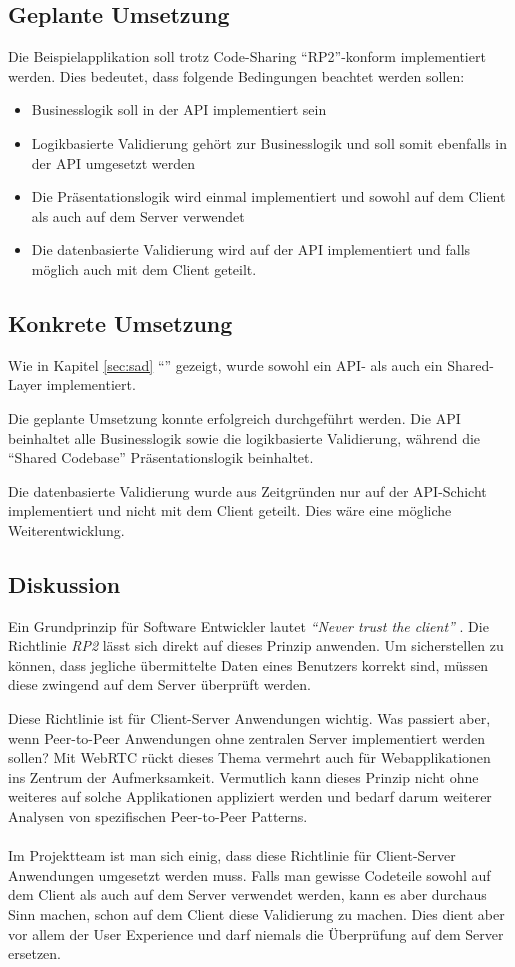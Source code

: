 \subsection*{Geplante Umsetzung}
Die Beispielapplikation soll trotz Code-Sharing ``RP2''-konform implementiert werden. Dies bedeutet, dass folgende Bedingungen beachtet werden sollen:
\begin{itemize}
	\item Businesslogik soll in der API implementiert sein
	\item Logikbasierte Validierung gehört zur Businesslogik und soll somit ebenfalls in der API umgesetzt werden
	\item Die Präsentationslogik wird einmal implementiert und sowohl auf dem Client als auch auf dem Server verwendet
	\item Die datenbasierte Validierung wird auf der API implementiert und falls möglich auch mit dem Client geteilt.
\end{itemize}

\subsection*{Konkrete Umsetzung}
Wie in Kapitel \ref{sec:sad} ``'' gezeigt, wurde sowohl ein API- als auch ein Shared-Layer implementiert.

Die geplante Umsetzung konnte erfolgreich durchgeführt werden. Die API beinhaltet alle Businesslogik sowie die logikbasierte Validierung, während die ``Shared Codebase'' Präsentationslogik beinhaltet.

Die datenbasierte Validierung wurde aus Zeitgründen nur auf der API-Schicht implementiert und nicht mit dem Client geteilt. Dies wäre eine mögliche Weiterentwicklung.

\subsection*{Diskussion}
Ein Grundprinzip für Software Entwickler lautet \emph{``Never trust the client''} \cite{DefensiveProgramming}. Die Richtlinie \emph{RP2} lässt sich direkt auf dieses Prinzip anwenden.
Um sicherstellen zu können, dass jegliche übermittelte Daten eines Benutzers korrekt sind, müssen diese zwingend auf dem Server überprüft werden.

Diese Richtlinie ist für Client-Server Anwendungen wichtig. Was passiert aber, wenn Peer-to-Peer Anwendungen ohne zentralen Server implementiert werden sollen? Mit \mbox{\gls{WebRTC}} \cite{WebRTC} rückt dieses Thema vermehrt auch für Webapplikationen ins Zentrum der Aufmerksamkeit. Vermutlich kann dieses Prinzip nicht ohne weiteres auf solche Applikationen appliziert werden und bedarf darum weiterer Analysen von spezifischen Peer-to-Peer Patterns.
\\ \\
Im Projektteam ist man sich einig, dass diese Richtlinie für Client-Server Anwendungen umgesetzt werden muss. Falls man gewisse Codeteile sowohl auf dem Client als auch auf dem Server verwendet werden, kann es aber durchaus Sinn machen, schon auf dem Client diese Validierung zu machen. Dies dient aber vor allem der User Experience und darf niemals die Überprüfung auf dem Server ersetzen.
